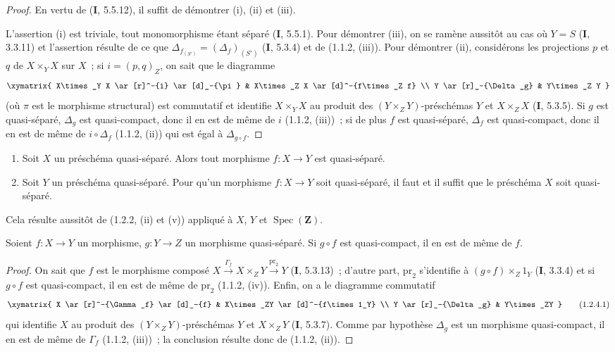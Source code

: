 \begin{proof}
En vertu de (\textbf{I}, 5.5.12), il suffit de démontrer (i), (ii) et (iii).

L'assertion (i) est triviale, tout monomorphisme étant séparé (\textbf{I}, 5.5.1).
Pour démontrer (iii), on se ramène aussitôt au cas où $Y=S$ (\textbf{I}, 3.3.11) et
l'assertion résulte de ce que
$\Delta_{f_{(S')}}=(\Delta_f)_{(S')}$ (\textbf{I}, 5.3.4) et de (1.1.2, (iii)). Pour
démontrer (ii), considérons les projections $p$ et $q$ de $X\times_Y X$ sur
$X$~; si $i=(p,q)_Z$, on sait que le diagramme
\[
\xymatrix{
  X\times_Y X \ar[r]^-{i} \ar[d]_-{\pi} & X\times_Z X
    \ar[d]^-{f\times_Z f} \\
  Y \ar[r]_-{\Delta_g} & Y\times_Z Y
}
\]
(où $\pi$ est le morphisme structural) est commutatif et identifie
$X\times_Y X$ au produit des $(Y\times_Z Y)$-préschémas $Y$ et
$X\times_Z X$ (\textbf{I}, 5.3.5). Si $g$ est quasi-séparé, $\Delta_g$ est
quasi-compact,
donc il en est de même de $i$ (1.1.2, (iii))~; si de plus $f$
est quasi-séparé, $\Delta_f$ est quasi-compact, donc il en est de même de
$i\circ\Delta_f$ (1.1.2, (ii)) qui est égal à $\Delta_{g\circ f}$.
\end{proof}

\begin{corollary}[1.2.3]
\label{IV.1.2.3-fr}
\begin{enumerate}
  \item[\textup{(i)}] Soit $X$ un préschéma quasi-séparé. Alors tout morphisme $f:X\to Y$
  est quasi-séparé.
  \item[\textup{(ii)}] Soit $Y$ un préschéma quasi-séparé. Pour qu'un morphisme $f:X\to Y$
  soit quasi-séparé, il faut et il suffit que le préschéma $X$ soit
  quasi-séparé.
\end{enumerate}
\end{corollary}

Cela résulte aussitôt de (1.2.2, (ii) et (v)) appliqué à $X$, $Y$ et
$\operatorname{Spec}(\mathbf Z)$.

\begin{proposition}[1.2.4]
\label{IV.1.2.4-fr}
Soient $f:X\to Y$ un morphisme, $g:Y\to Z$ un morphisme quasi-séparé. Si
$g\circ f$ est quasi-compact, il en est de même de $f$.
\end{proposition}

\begin{proof}
On sait que $f$ est le morphisme composé
$X\xrightarrow{\Gamma_f}X\times_ZY\xrightarrow{\mathrm{pr}_2}Y$
(\textbf{I}, 5.3.13)~; d'autre part, $\mathrm{pr}_2$ s'identifie à
$(g\circ f)\times_Z1_Y$ (\textbf{I}, 3.3.4) et si $g\circ f$ est quasi-compact, il en
est de même de $\mathrm{pr}_2$ (1.1.2, (iv)). Enfin, on a le diagramme
commutatif
\[
\xymatrix{
  X \ar[r]^-{\Gamma_f} \ar[d]_-{f} & X\times_ZY
    \ar[d]^-{f\times 1_Y} \\
  Y \ar[r]_-{\Delta_g} & Y\times_ZY
}
\tag{1.2.4.1}
\label{IV.1.2.4.1-fr}
\]
qui identifie $X$ au produit des $(Y\times_ZY)$-préschémas $Y$ et
$X\times_ZY$ (\textbf{I}, 5.3.7). Comme par hypothèse $\Delta_g$ est un morphisme
quasi-compact, il en est de même de $\Gamma_f$ (1.1.2, (iii))~; la conclusion
résulte donc de (1.1.2, (ii)).
\end{proof}

